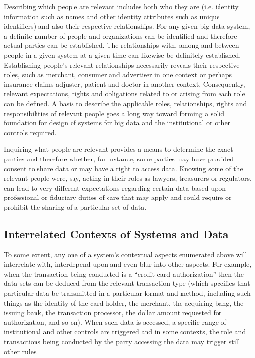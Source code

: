Describing which people are relevant includes both who they are (i.e. identity information such as names and other identity attributes such as unique identifiers) and also their respective relationships.
For any given big data system, a definite number of people and organizations can be identified and therefore actual parties can be established.
The relationships with, among and between people in a given system at a given time can likewise be definitely established.
Establishing people’s relevant relationships necessarily reveals their respective roles, such as merchant, consumer and advertiser in one context or perhaps insurance claims adjuster, patient and doctor in another context. 
Consequently, relevant expectations, rights and obligations related to or arising from each role can be defined. 
A basis to describe the applicable roles, relationships, rights and responsibilities of relevant people goes a long way toward forming a solid foundation for design of systems for big data and the institutional or other controls required.

Inquiring what people are relevant provides a means to determine the exact parties and therefore whether, for instance, some parties may have provided consent to share data or may have a right to access data.
Knowing some of the relevant people were, say, acting in their roles as lawyers, treasurers or regulators, can lead to very different expectations regarding certain data based upon professional or fiduciary duties of care that may apply and could require or prohibit the sharing of a particular set of data.

\subsection{Interrelated Contexts of Systems and Data}

To some extent, any one of a system’s contextual aspects enumerated above will interrelate with, interdepend upon and even blur into other aspects.
For example, when the transaction being conducted is a “credit card authorization” then the data-sets can be deduced from the relevant transaction type (which specifies that particular data be transmitted in a particular format and method, including such things as the identity of the card holder, the merchant, the acquiring bang, the issuing bank, the transaction processor, the dollar amount requested for authorization, and so on).
When such data is accessed, a specific range of institutional and other controls are triggered and in some contexts, the role and transactions being conducted by the party accessing the data may trigger still other rules.

